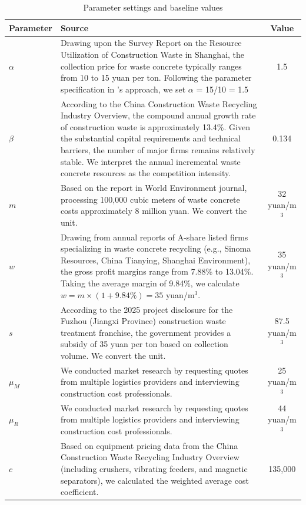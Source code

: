 \documentclass[authoryear,preprint,review,times,10pt]{elsarticle}
\begin{document}
\begin{table}[!htbp]
\centering
\captionsetup{font=normalsize, labelsep=period}
\caption{Parameter settings and baseline values}
\label{tab:parameters}
\normalsize
\begin{tabular}{lp{6cm}c}
\toprule
\textbf{Parameter} & \textbf{Source} & \textbf{Value} \\
\midrule
$\alpha$ & Drawing upon the Survey Report on the Resource Utilization of Construction Waste in Shanghai, the collection price for waste concrete typically ranges from 10 to 15 yuan per ton. Following the parameter specification in \citep{wang2025Mechanism}'s approach, we set $\alpha$ = 15/10 = 1.5 & 1.5 \\
\midrule
$\beta$ & According to the China Construction Waste Recycling Industry Overview, the compound annual growth rate of construction waste is approximately 13.4\%. Given the substantial capital requirements and technical barriers, the number of major firms remains relatively stable. We interpret the annual incremental waste concrete resources as the competition intensity. & 0.134 \\
\midrule
$m$ & Based on the report in World Environment journal, processing 100,000 cubic meters of waste concrete costs approximately 8 million yuan. We convert the unit. & 32 yuan/m$^3$ \\
\midrule
$w$ & Drawing from annual reports of A-share listed firms specializing in waste concrete recycling (e.g., Sinoma Resources, China Tianying, Shanghai Environment), the gross profit margins range from 7.88\% to 13.04\%. Taking the average margin of 9.84\%, we calculate $w = m \times (1 + 9.84\%) = 35$ yuan/m$^3$. & 35 yuan/m$^3$ \\
\midrule
$s$ & According to the 2025 project disclosure for the Fuzhou (Jiangxi Province) construction waste treatment franchise, the government provides a subsidy of 35 yuan per ton based on collection volume. We convert the unit. & 87.5 yuan/m$^3$ \\
\midrule
$\mu_M$ & We conducted market research by requesting quotes from multiple logistics providers and interviewing construction cost professionals. & 25 yuan/m$^3$ \\
\midrule
$\mu_R$ & We conducted market research by requesting quotes from multiple logistics providers and interviewing construction cost professionals. & 44 yuan/m$^3$ \\
\midrule
$c$ & Based on equipment pricing data from the China Construction Waste Recycling Industry Overview (including crushers, vibrating feeders, and magnetic separators), we calculated the weighted average cost coefficient. & 135,000 \\

\end{tabular}
\end{table}
\end{document}
